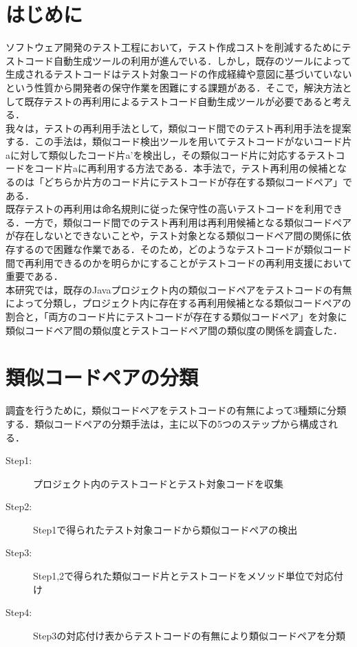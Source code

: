 \documentclass{fose2019}           %
\begin{document}
\section{はじめに}
ソフトウェア開発のテスト工程において，テスト作成コストを削減するためにテストコード自動生成ツールの利用が進んでいる．しかし，既存のツールによって生成されるテストコードはテスト対象コードの作成経緯や意図に基づいていないという性質から開発者の保守作業を困難にする課題がある\cite{1}．そこで，解決方法として既存テストの再利用によるテストコード自動生成ツールが必要であると考える．
\\\indent 我々は，テストの再利用手法として，類似コード間でのテスト再利用手法を提案する．この手法は，類似コード検出ツール\cite{Nicad}を用いてテストコードがないコード片aに対して類似したコード片a'を検出し，その類似コード片に対応するテストコードをコード片aに再利用する方法である．本手法で，テスト再利用の候補となるのは「どちらか片方のコード片にテストコードが存在する類似コードペア」である．
\\\indent 既存テストの再利用は命名規則に従った保守性の高いテストコードを利用できる．一方で，類似コード間でのテスト再利用は再利用候補となる類似コードペアが存在しないとできないことや，テスト対象となる類似コードペア間の関係に依存するので困難な作業である．そのため，どのようなテストコードが類似コード間で再利用できるのかを明らかにすることがテストコードの再利用支援において重要である．
\\\indent 本研究では，既存のJavaプロジェクト内の類似コードペアをテストコードの有無によって分類し，プロジェクト内に存在する再利用候補となる類似コードペアの割合と，「両方のコード片にテストコードが存在する類似コードペア」を対象に類似コードペア間の類似度とテストコードペア間の類似度の関係を調査した．

\section{類似コードペアの分類}
調査を行うために，類似コードペアをテストコードの有無によって3種類に分類する．類似コードペアの分類手法は，主に以下の5つのステップから構成される．
\begin{description}
\item[Step1:]プロジェクト内のテストコードとテスト対象コードを収集
\item[Step2:]Step1で得られたテスト対象コードから類似コードペアの検出
\item[Step3:]Step1,2で得られた類似コード片とテストコードをメソッド単位で対応付け
\item[Step4:]Step3の対応付け表からテストコードの有無により類似コードペアを分類
\end{description}
\end{document}
